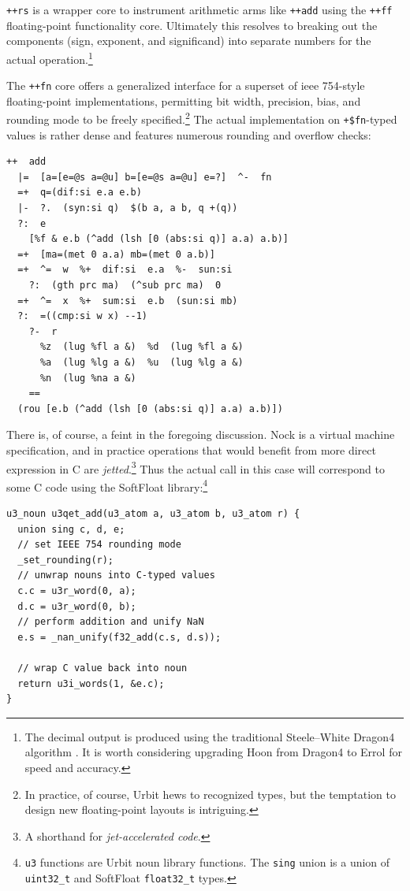 \documentclass[twoside]{article}
\begin{document}
\lstinline[style=inlinecode]{++rs} is a wrapper core to instrument arithmetic arms like \lstinline[style=inlinecode]{++add} using the \lstinline[style=inlinecode]{++ff} floating-point functionality core.  Ultimately this resolves to breaking out the components (sign, exponent, and significand) into separate numbers for the actual operation.\footnote{The decimal output is produced using the traditional Steele–White Dragon4 algorithm \citep{Steele1991}.  It is worth considering upgrading Hoon from Dragon4 to Errol \citep{Andrysco2016} for speed and accuracy.}

The \lstinline[style=inlinecode]{++fn} core offers a generalized interface for a superset of {\sc ieee} 754-style floating-point implementations, permitting bit width, precision, bias, and rounding mode to be freely specified.\footnote{In practice, of course, Urbit hews to recognized types, but the temptation to design new floating-point layouts is intriguing.}  The actual implementation on \lstinline[style=inlinecode]{+$fn}-typed values is rather dense and features numerous rounding and overflow checks:

\begin{lstlisting}[style=listingcode]
++  add
  |=  [a=[e=@s a=@u] b=[e=@s a=@u] e=?]  ^-  fn
  =+  q=(dif:si e.a e.b)
  |-  ?.  (syn:si q)  $(b a, a b, q +(q))
  ?:  e
    [%f & e.b (^add (lsh [0 (abs:si q)] a.a) a.b)]
  =+  [ma=(met 0 a.a) mb=(met 0 a.b)]
  =+  ^=  w  %+  dif:si  e.a  %-  sun:si
    ?:  (gth prc ma)  (^sub prc ma)  0
  =+  ^=  x  %+  sum:si  e.b  (sun:si mb)
  ?:  =((cmp:si w x) --1)
    ?-  r
      %z  (lug %fl a &)  %d  (lug %fl a &)
      %a  (lug %lg a &)  %u  (lug %lg a &)
      %n  (lug %na a &)
    ==
  (rou [e.b (^add (lsh [0 (abs:si q)] a.a) a.b)])
\end{lstlisting}

There is, of course, a feint in the foregoing discussion.  Nock is a virtual machine specification, and in practice operations that would benefit from more direct expression in C are \emph{jetted}.\footnote{A shorthand for \emph{jet-accelerated code}.}  Thus the actual call in this case will correspond to some C code using the SoftFloat library:\footnote{\texttt{u3} functions are Urbit noun library functions.  The \texttt{sing} union is a union of \texttt{uint32\_t} and SoftFloat \texttt{float32\_t} types.}

\lstset{language=C}
\begin{lstlisting}[style=listingcode_c]
u3_noun u3qet_add(u3_atom a, u3_atom b, u3_atom r) {
  union sing c, d, e;
  // set IEEE 754 rounding mode
  _set_rounding(r);
  // unwrap nouns into C-typed values
  c.c = u3r_word(0, a);
  d.c = u3r_word(0, b);
  // perform addition and unify NaN
  e.s = _nan_unify(f32_add(c.s, d.s));

  // wrap C value back into noun
  return u3i_words(1, &e.c);
}
\end{lstlisting}
\end{document}

